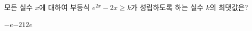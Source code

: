 모든 실수 $x$에 대하여 부등식 $e^{2x}-2x\ge k$가 성립하도록 하는 실수 $k$의 최댓값은?
\begin{choices32}{$-e$}{$-2$}{$1$}{$2$}{$e$}\end{choices32}
